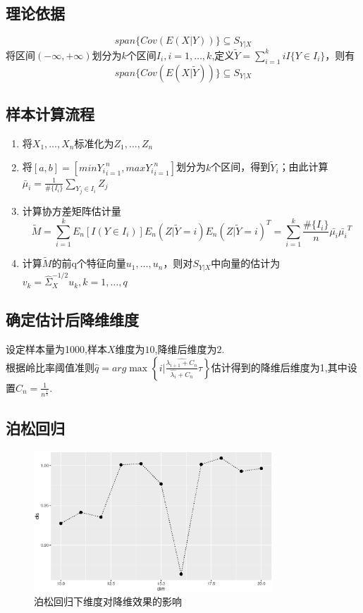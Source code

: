 \subsection{理论依据}
    \begin{equation*}
        span\{Cov(E(X|Y))\}\subseteq S_{Y|X}
    \end{equation*}
    将区间$(-\infty,+\infty)$划分为$k$个区间$I_i, i=1,\dots,k$,定义$\widetilde{Y}=\sum_{i=1}^kiI\{Y\in I_i\}$，则有
    \begin{equation*}
        span\{Cov(E(X|\widetilde{Y}))\}\subseteq S_{Y|X}
    \end{equation*}
\subsection{样本计算流程}
    \begin{enumerate}
        \item 将$X_1,\dots,X_n$标准化为$Z_1,\dots,Z_n$
        \item 将$[a,b]=[min{Y_i}_{i=1}^n,max{Y_i}_{i=1}^n]$划分为$k$个区间，得到$\widetilde{Y}_i$；由此计算$\bar{\mu}_i=\frac{1}{\#\{I_i\}}\sum_{Y_j\in I_i}Z_j$
        \item 计算协方差矩阵估计量$$\widetilde{M}=\sum_{i=1}^kE_n[I(Y\in I_i)] E_n(Z|\widetilde{Y}=i) E_n(Z|\widetilde{Y}=i)^T=\sum_{i=1}^k\frac{\#\{I_i\}}{n}\bar{\mu_i}\bar{\mu_i}^T$$
        \item 计算$\widetilde{M}$的前q个特征向量$u_1,\dots,u_n$，则对$S_{Y|X}$中向量的估计为$v_k=\hat{\Sigma}_{X}^{-1/2}u_k,k=1,\dots,q$
    \end{enumerate}

\subsection{确定估计后降维维度}
    设定样本量为1000,样本$X$维度为$10$,降维后维度为$2$.\\
    根据岭比率阈值准则$\hat{q} = arg\max\left\{i|\frac{\hat{\lambda_{i+1}+C_n}}{\hat{\lambda_i}+C_n}\tau\right\}$估计得到的降维后维度为1,其中设置$C_n = \frac{1}{n^\frac{1}{3} }$.

    
    
\subsection{泊松回归}
    \begin{figure}[H]
        \centering
        \includegraphics[width=0.8\textwidth]{image/pois_sir.eps}
        \caption{泊松回归下维度对降维效果的影响}
    \end{figure}



